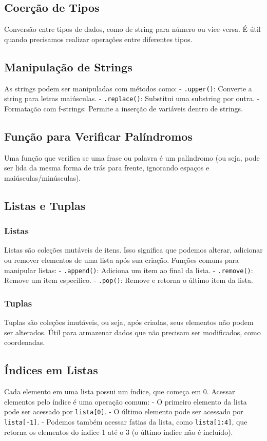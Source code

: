 \documentclass{sciposter}
\begin{document}
\begin{multicols}{3}
\subsection{Coerção de Tipos}
Conversão entre tipos de dados, como de string para número ou vice-versa. É útil quando precisamos realizar operações entre diferentes tipos.

\subsection{Manipulação de Strings}
As strings podem ser manipuladas com métodos como:
- \texttt{.upper()}: Converte a string para letras maiúsculas.
- \texttt{.replace()}: Substitui uma substring por outra.
- Formatação com f-strings: Permite a inserção de variáveis dentro de strings.

\subsection{Função para Verificar Palíndromos}
Uma função que verifica se uma frase ou palavra é um palíndromo (ou seja, pode ser lida da mesma forma de trás para frente, ignorando espaços e maiúsculas/minúsculas).

\subsection{Listas e Tuplas}

\subsubsection{Listas}
Listas são coleções mutáveis de itens. Isso significa que podemos alterar, adicionar ou remover elementos de uma lista após sua criação.
Funções comuns para manipular listas:
- \texttt{.append()}: Adiciona um item ao final da lista.
- \texttt{.remove()}: Remove um item específico.
- \texttt{.pop()}: Remove e retorna o último item da lista.

\subsubsection{Tuplas}
Tuplas são coleções imutáveis, ou seja, após criadas, seus elementos não podem ser alterados. Útil para armazenar dados que não precisam ser modificados, como coordenadas.

\subsection{Índices em Listas}
Cada elemento em uma lista possui um índice, que começa em 0. Acessar elementos pelo índice é uma operação comum:
- O primeiro elemento da lista pode ser acessado por \texttt{lista[0]}.
- O último elemento pode ser acessado por \texttt{lista[-1]}.
- Podemos também acessar fatias da lista, como \texttt{lista[1:4]}, que retorna os elementos do índice 1 até o 3 (o último índice não é incluído).


\end{multicols}
\end{document}
